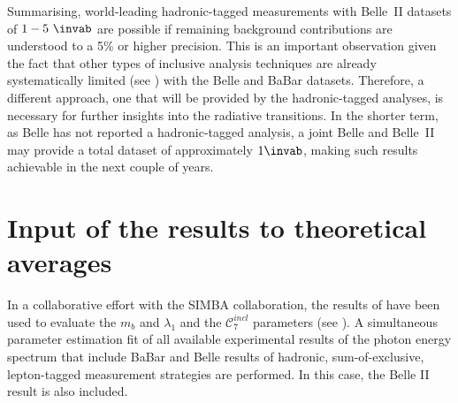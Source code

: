 Summarising, world-leading hadronic-tagged \BtoXsgamma measurements with Belle~II datasets of $1-5~\invab$ are possible if remaining background contributions are understood to a 5\% or higher precision.
This is an important observation given the fact that other types of inclusive \BtoXsgamma analysis techniques are already systematically limited (see ) with the Belle and BaBar datasets.
Therefore, a different approach, one that will be provided by the hadronic-tagged analyses, is necessary for further insights into the radiative \BtoXsgamma transitions.
In the shorter term, as Belle has not reported a hadronic-tagged \BtoXsgamma analysis, a joint Belle and Belle~II may provide a total dataset of approximately $1\invab$, making such results achievable in the next couple of years.

\section{Input of the results to theoretical averages}\label{sec:input_to_theory}

In a collaborative effort with the SIMBA collaboration, the results of 
have been used to evaluate the $m_b$ and $\lambda_1$ and the $\mathcal{C}_7^{incl}$ parameters (see ). 
A simultaneous parameter estimation fit of all available experimental results of the photon energy spectrum that include
BaBar and Belle results of hadronic, sum-of-exclusive, lepton-tagged measurement strategies are performed.
In this case, the Belle II result is also included.

